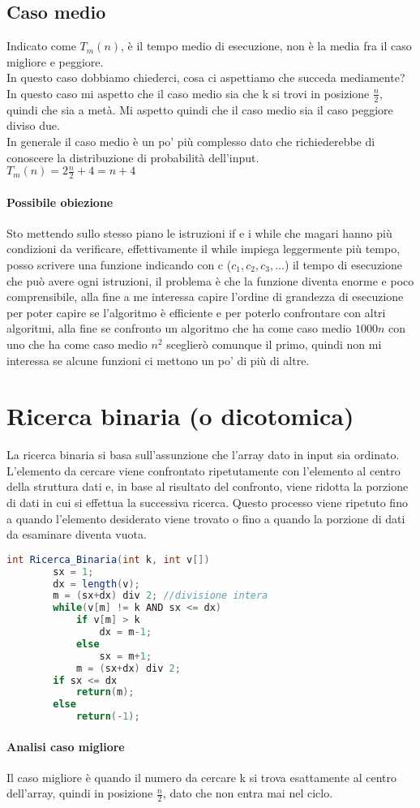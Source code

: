 \subsection{Caso medio}
Indicato come \textbf{$T_m(n)$}, è il tempo medio di esecuzione, non è la media fra il caso migliore e peggiore.\\
In questo caso dobbiamo chiederci, cosa ci aspettiamo che succeda mediamente?\\ In questo caso
mi aspetto che il caso medio sia che k si trovi in posizione $\frac{n}{2}$, quindi che sia a metà. Mi
aspetto quindi che il caso medio sia il caso peggiore diviso due.\\
In generale il caso medio è un po' più complesso dato che richiederebbe di conoscere la distribuzione
di probabilità dell'input.\\
$T_m(n)=2\frac{n}{2}+4=n+4$\\
\paragraph*{Possibile obiezione} Sto mettendo sullo stesso piano le istruzioni if e i while
che magari hanno più condizioni da verificare, effettivamente il while impiega leggermente
più tempo, posso scrivere una funzione indicando con c ($c_1, c_2, c_3, \dots$) il tempo di
esecuzione che può avere ogni istruzioni, il problema è che la funzione diventa enorme e poco
comprensibile, alla fine a me interessa capire l'ordine di grandezza di esecuzione per poter
capire se l'algoritmo è efficiente e per poterlo confrontare con altri algoritmi, alla fine
se confronto un algoritmo che ha come caso medio $1000n$ con uno che ha come caso medio $n^2$
sceglierò comunque il primo, quindi non mi interessa se alcune funzioni ci mettono un po' di più di
altre.

\section{Ricerca binaria (o dicotomica)}
La ricerca binaria si basa sull'assunzione che l'array dato in input sia ordinato.\\
L'elemento da cercare viene confrontato ripetutamente con l'elemento al centro 
della struttura dati e, in base al risultato del confronto, 
viene ridotta la porzione di dati in cui si effettua la successiva ricerca. 
Questo processo viene ripetuto fino a quando l'elemento desiderato viene trovato o 
fino a quando la porzione di dati da esaminare diventa vuota.
\begin{lstlisting}[language=Java]
    int Ricerca_Binaria(int k, int v[])
        sx = 1;
        dx = length(v);
        m = (sx+dx) div 2; //divisione intera
        while(v[m] != k AND sx <= dx)
            if v[m] > k
                dx = m-1;
            else 
                sx = m+1;
            m = (sx+dx) div 2;
        if sx <= dx
            return(m);
        else
            return(-1);
\end{lstlisting}
\paragraph*{Analisi caso migliore} Il caso migliore è quando il numero da cercare k si trova
esattamente al centro dell'array, quindi in posizione $\frac{n}{2}$, dato che non entra mai nel ciclo.